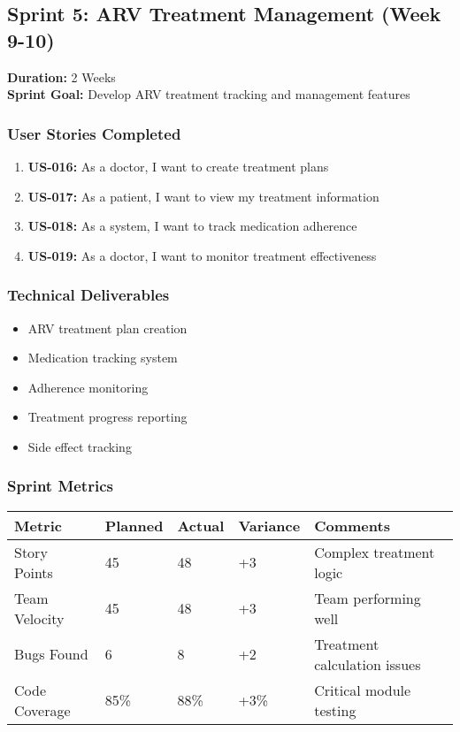 \documentclass[12pt,a4paper]{article}
\begin{document}
\subsection{Sprint 5: ARV Treatment Management (Week 9-10)}
\textbf{Duration:} 2 Weeks \\
\textbf{Sprint Goal:} Develop ARV treatment tracking and management features

\subsubsection{User Stories Completed}
\begin{enumerate}
    \item \textbf{US-016:} As a doctor, I want to create treatment plans
    \item \textbf{US-017:} As a patient, I want to view my treatment information
    \item \textbf{US-018:} As a system, I want to track medication adherence
    \item \textbf{US-019:} As a doctor, I want to monitor treatment effectiveness
\end{enumerate}

\subsubsection{Technical Deliverables}
\begin{itemize}
    \item ARV treatment plan creation
    \item Medication tracking system
    \item Adherence monitoring
    \item Treatment progress reporting
    \item Side effect tracking
\end{itemize}

\subsubsection{Sprint Metrics}
\begin{longtable}{|p{4cm}|p{2cm}|p{2cm}|p{2cm}|p{4cm}|}
\hline
\textbf{Metric} & \textbf{Planned} & \textbf{Actual} & \textbf{Variance} & \textbf{Comments} \\
\hline
Story Points & 45 & 48 & +3 & Complex treatment logic \\
\hline
Team Velocity & 45 & 48 & +3 & Team performing well \\
\hline
Bugs Found & 6 & 8 & +2 & Treatment calculation issues \\
\hline
Code Coverage & 85\% & 88\% & +3\% & Critical module testing \\
\hline
\end{longtable}
\end{document}
